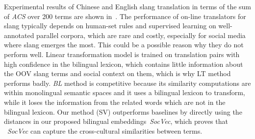 Experimental results of Chinese and English slang translation in terms of the sum of \textit{ACS} over 200 terms are shown in~.
The performance of on-line translators for slang typically depends on human-set rules and supervised learning on well-annotated parallel corpora, which are rare and costly, especially for social media where slang emerges the most. This could be a possible reason why they do not perform well. 
Linear transformation model is trained on translation pairs with high confidence in the bilingual lexicon, which contains little information about the OOV slang terms and social context on them, which is why LT method performs badly.
\textit{BL} method is competitive because its similarity computations 
are within monolingual semantic spaces and it uses a bilingual lexicon 
to transform, while it loses the information from the related words 
which are not in the bilingual lexicon.
Our method (SV) outperforms baselines by directly using the distances in 
our proposed bilingual embeddings~\textit{SocVec}, which proves 
that ~\textit{SocVec} can capture the cross-cultural similarities between terms.

